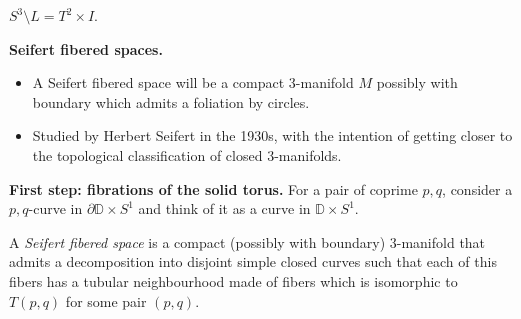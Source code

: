 \begin{example}
\label{example-complement-hopf-link}
$S^3\setminus L = T^2 \times I$.
\end{example}

\begin{example}
\label{example-gluing-examples}

\end{example}

\medskip\noindent
{\bf Seifert fibered spaces.}

\begin{remark}
\label{remark-seifert}
\begin{itemize}
\item A Seifert fibered space will be a
compact 3-manifold $M$ possibly with
boundary which admits a foliation by
circles.
\item Studied by Herbert Seifert in the
1930s, with the intention of getting closer
to the topological classification of closed
3-manifolds.
\end{itemize}
\end{remark}

\noindent
{\bf First step: fibrations of the solid
torus.} For a pair of coprime  $p,q$,
consider a $p,q$-curve in $\partial
\mathbb{D}\times S^1$ and think of it as a
curve in $\mathbb{D}\times S^1$.

\begin{definition}
\label{definition-seibert-fibered}
A {\it Seifert fibered space} is a compact
(possibly with boundary) 3-manifold
that admits a decomposition into disjoint
simple closed curves such that each of this
fibers has a tubular neighbourhood made of
fibers which is isomorphic to $T(p,q)$ for
some pair $(p,q)$.
\end{definition}

\begin{example}
\label{example-hopf-fibration}
\end{example}

\begin{example}
\label{example-half-turn-flat-mfd}

\end{example}

